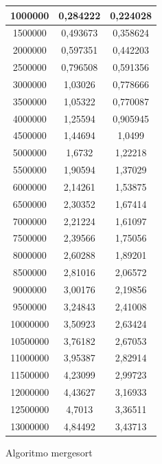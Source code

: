 \documentclass[12pt,spanish]{article}
\begin{document}
\begin{figure}[H]
\begin{tabular}{|c|c|c|}
\hline
1000000 & 0,284222 & 0,224028 \\
\hline
1500000 & 0,493673 & 0,358624 \\
\hline
2000000 & 0,597351 & 0,442203 \\
\hline
2500000 & 0,796508 & 0,591356 \\
\hline
3000000 & 1,03026 & 0,778666 \\
\hline
3500000 & 1,05322 & 0,770087 \\
\hline
4000000 & 1,25594 & 0,905945 \\
\hline
4500000 & 1,44694 & 1,0499 \\
\hline
5000000 & 1,6732 & 1,22218 \\
\hline
5500000 & 1,90594 & 1,37029 \\
\hline
6000000 & 2,14261 & 1,53875 \\
\hline
6500000 & 2,30352 & 1,67414 \\
\hline
7000000 & 2,21224 & 1,61097 \\
\hline
7500000 & 2,39566 & 1,75056 \\
\hline
8000000 & 2,60288 & 1,89201 \\
\hline
8500000 & 2,81016 & 2,06572 \\
\hline
9000000 & 3,00176 & 2,19856 \\
\hline
9500000 & 3,24843 & 2,41008 \\
\hline
10000000 & 3,50923 & 2,63424 \\
\hline
10500000 & 3,76182 & 2,67053 \\
\hline
11000000 & 3,95387 & 2,82914 \\
\hline
11500000 & 4,23099 & 2,99723 \\
\hline
12000000 & 4,43627 & 3,16933 \\
\hline
12500000 & 4,7013 & 3,36511 \\
\hline
13000000 & 4,84492 & 3,43713 \\
\hline
\end{tabular}
\caption{Algoritmo mergesort}
\end{figure}
\end{document}
